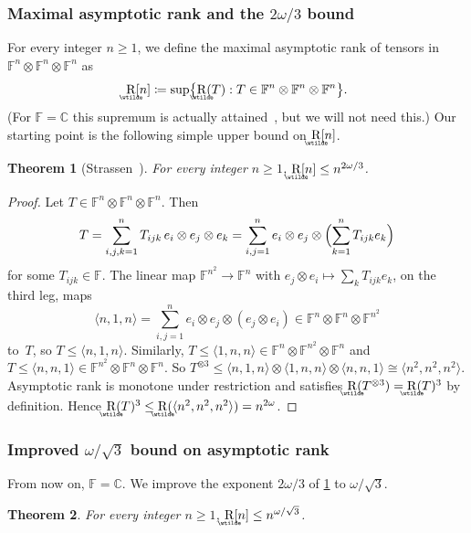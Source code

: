 \documentclass[11pt,letterpaper]{article}
\numberwithin{equation}{section}
\newtheorem{theorem}{Theorem}[section]
\theoremstyle{definition}
\DeclareMathOperator{\asymprank}{\underaccent{\wtilde}{R}}
\newcommand{\CC}{\mathbb{C}}
\newcommand{\FF}{\mathbb{F}}
\begin{document}
\subsubsection{Maximal asymptotic rank and the \texorpdfstring{$2\omega/3$}{2omega/3} bound}

For every integer $n\ge1$, we define the maximal asymptotic rank of tensors in $\FF^n \otimes \FF^n \otimes \FF^n$ as
\[
 \asymprank[n]\coloneqq\sup\bigl\{\asymprank(T):T\in\FF^n\otimes\FF^n\otimes\FF^n\bigr\}.
\]
(For $\FF=\CC$ this supremum is actually attained~\cite[Theorem~1.2]{christandl2026asymptotictensorrankcharacterized}, but we will not need this.) Our starting point is the following simple upper bound on $\asymprank[n]$.

\begin{theorem}[Strassen~{\cite[Lemma~3.5 and~(1.3)]{strassen1988asymptotic}}]\label{thm:strassenbound}
For every integer $n\ge1$, $\asymprank[n]\le n^{2\omega/3}$.
\end{theorem}

\begin{proof}
Let $T\in\FF^n\otimes\FF^n\otimes\FF^n$. Then
\[
 T=\sum_{i,j,k=1}^nT_{ijk}\,e_i\otimes e_j\otimes e_k=\sum_{i,j=1}^ne_i\otimes e_j\otimes\Bigl(\sum_{k=1}^nT_{ijk}e_k\Bigr)
\]
for some $T_{ijk}\in\FF$. The linear map $\FF^{n^2}\to\FF^n$ with $e_j\otimes e_i\mapsto\sum_kT_{ijk}e_k$, on the third leg,
maps
\[
 \langle n,1,n\rangle=\sum_{i,j=1}^ne_i\otimes e_j\otimes(e_j\otimes e_i)\in\FF^n\otimes\FF^n\otimes\FF^{n^2}
\]
to~$T$, so $T\le\langle n,1,n\rangle$. Similarly, $T\le\langle1,n,n\rangle\in\FF^n\otimes\FF^{n^2}\otimes\FF^n$ and
$T\le\langle n,n,1\rangle\in\FF^{n^2}\otimes\FF^n\otimes\FF^n$. So $T^{\otimes3}\le\langle n,1,n\rangle\otimes\langle1,n,n\rangle\otimes\langle n,n,1\rangle\cong\langle n^2,n^2,n^2\rangle$. Asymptotic rank is
monotone under restriction and satisfies $\asymprank(T^{\otimes3})=\asymprank(T)^3$ by definition. Hence
$\asymprank(T)^3\le\asymprank(\langle n^2,n^2,n^2\rangle)=n^{2\omega}$.
\end{proof}

\subsubsection{Improved \texorpdfstring{$\omega/\sqrt3$}{omega/sqrt3} bound on asymptotic rank}

From now on, $\FF=\CC$. We improve the exponent $2\omega/3$ of \cref{thm:strassenbound} to $\omega/\sqrt3$.

\begin{theorem}\label{thm:bound}
For every integer $n\ge1$, $\asymprank[n]\le n^{\omega/\sqrt3}$.
\end{theorem}
\end{document}
